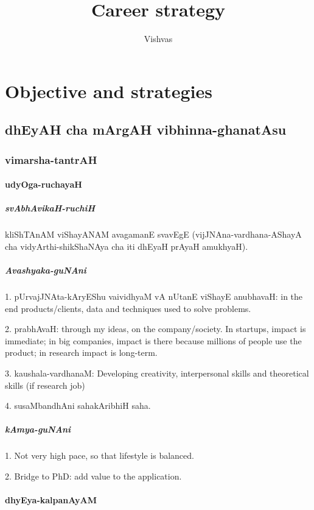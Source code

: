 \documentclass[oneside, article]{memoir}
\title{Career strategy}
\author{Vishvas}
\begin{document}
\maketitle


\part{Objective and strategies}
\chapter{dhEyAH cha mArgAH vibhinna-ghanatAsu}
\section{vimarsha-tantrAH}
\subsection{udyOga-ruchayaH}
\subsubsection{svAbhAvikaH-ruchiH}
kliShTAnAM viShayANAM avagamanE svavEgE (vijJNAna-vardhana-AShayA cha vidyArthi-shikShaNAya cha iti dhEyaH prAyaH amukhyaH).

\subsubsection{Avashyaka-guNAni}
1. pUrvajJNAta-kAryEShu vaividhyaM vA nUtanE viShayE anubhavaH: in the end products/clients, data and techniques used to solve problems.

2. prabhAvaH: through my ideas, on the company/society. In startups, impact is immediate; in big companies, impact is there because millions of people use the product; in research impact is long-term.

3. kaushala-vardhanaM: Developing creativity, interpersonal skills  and theoretical skills (if research job)

4. susaMbandhAni sahakAribhiH saha.

\subsubsection{kAmya-guNAni}
1. Not very high pace, so that lifestyle is balanced.

2. Bridge to PhD: add value to the application.

\subsection{dhyEya-kalpanAyAM}
\end{document}
